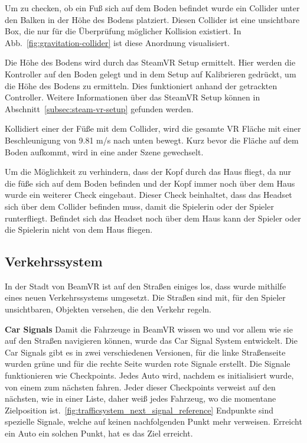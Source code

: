 Um zu checken, ob ein Fuß sich auf dem Boden befindet wurde ein Collider unter den Balken in der Höhe des Bodens platziert.
Diesen Collider ist eine unsichtbare Box, die nur für die Überprüfung möglicher Kollision existiert.
In Abb.~\ref{fig:gravitation-collider} ist diese Anordnung visualisiert.

Die Höhe des Bodens wird durch das SteamVR Setup ermittelt.
Hier werden die Kontroller auf den Boden gelegt und in dem Setup auf Kalibrieren gedrückt, um die Höhe des Bodens zu ermitteln.
Dies funktioniert anhand der getrackten Controller.
Weitere Informationen über das SteamVR Setup können in Abschnitt~\ref{subsec:steam-vr-setup} gefunden werden.

Kollidiert einer der Füße mit dem Collider, wird die gesamte VR Fläche mit einer Beschleunigung von 9.81 m/s nach unten bewegt.
Kurz bevor die Fläche auf dem Boden aufkommt, wird in eine ander Szene gewechselt.

Um die Möglichkeit zu verhindern, dass der Kopf durch das Haus fliegt, da nur die füße sich auf dem Boden befinden und der Kopf immer noch über dem Haus wurde ein weiterer Check eingebaut.
Dieser Check beinhaltet, dass das Headset sich über dem Collider befinden muss, damit die Spielerin oder der Spieler runterfliegt.
Befindet sich das Headset noch über dem Haus kann der Spieler oder die Spielerin nicht von dem Haus fliegen.

\subsection{Verkehrssystem}
\label{subsec:traffic-system}
In der Stadt von BeamVR ist auf den Straßen einiges los, dass wurde mithilfe eines neuen Verkehrssystems umgesetzt.
Die Straßen sind mit, f\"ur den Spieler unsichtbaren, Objekten versehen, die den Verkehr regeln.

\textbf{Car Signals}
Damit die Fahrzeuge in BeamVR wissen wo und vor allem wie sie auf den Straßen navigieren k\"onnen, wurde das Car Signal System entwickelt.
Die Car Signals gibt es in zwei verschiedenen Versionen, f\"ur die linke Straßenseite wurden gr\"une und f\"ur die rechte Seite wurden rote Signale erstellt.
Die Signale funktionieren wie Checkpoints.
Jedes Auto wird, nachdem es initialisiert wurde, von einem zum n\"achsten fahren.
Jeder dieser Checkpoints verweist auf den nächsten, wie in einer Liste, daher weiß jedes Fahrzeug, wo die momentane Zielposition ist.~\ref{fig:trafficsystem_next_signal_reference}
Endpunkte sind spezielle Signale, welche auf keinen nachfolgenden Punkt mehr verweisen.
Erreicht ein Auto ein solchen Punkt, hat es das Ziel erreicht.

